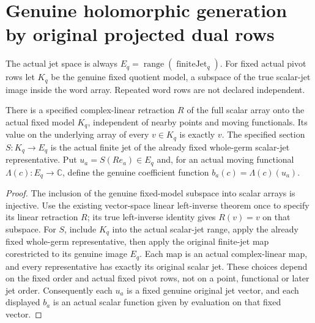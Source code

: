 \section{Genuine holomorphic generation by original projected dual rows}

The actual jet space is always
$E_q=\operatorname{range}(\operatorname{finiteJet}_q)$. For fixed
actual pivot rows let $K_q$ be the genuine fixed quotient model,
a subspace of the true scalar-jet image inside the word array.
Repeated word rows are not declared independent.

\begin{theorem}
\label{hir:actual-fixed-quotient-retraction-and-true-jet-section}
\leanok
There is a specified complex-linear retraction $R$ of the full scalar
array onto the actual fixed model $K_q$, independent of nearby points
and moving functionals. Its value on the underlying array of every
$v\in K_q$ is exactly $v$. The specified section $S:K_q\to E_q$
is the actual finite jet of the already fixed whole-germ scalar-jet
representative. Put
$u_a=S(R e_a)\in E_q$ and, for an actual moving functional
$\Lambda(c):E_q\to\mathbb C$, define the genuine coefficient function
$b_a(c)=\Lambda(c)(u_a)$.
\end{theorem}
\begin{proof}
The inclusion of the genuine fixed-model subspace into scalar arrays
is injective. Use the existing vector-space linear left-inverse theorem
once to specify its linear retraction $R$; its true left-inverse
identity gives $R(v)=v$ on that subspace. For $S$, include $K_q$ into
the actual scalar-jet range, apply the already fixed whole-germ
representative, then apply the original finite-jet map corestricted
to its genuine image $E_q$. Each map is an actual complex-linear map,
and every representative has exactly its original scalar jet. These
choices depend on the fixed order and actual fixed pivot rows, not
on a point, functional or later jet order. Consequently each $u_a$
is a fixed genuine original jet vector, and each displayed $b_a$ is
an actual scalar function given by evaluation on that fixed vector.
\end{proof}

